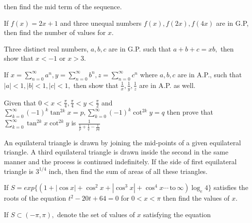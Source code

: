  then find the mid term of the sequence.
\item If $f(x) = 2x + 1$ and three unequal numbers $f(x), f(2x), f(4x)$ are in G.P, then find the number of values for
  $x$.
\item Three distinct real numbers, $a, b, c$ are in G.P. such that $a + b + c = xb,$ then show that $x < -1$ or $x > 3$.
\item If $\displaystyle x = \sum_{n=0}^\infty a^n, y = \sum_{n=0}^\infty b^n, z = \sum_{n=0}^\infty c^n$ where $a, b, c$ are in A.P.,
  such that $|a| < 1, |b|< 1, |c| < 1,$ then show that $\frac{1}{x}, \frac{1}{y}, \frac{1}{z}$ are in A.P. as well.
\item Given that $0 < x< \frac{\pi}{4}, \frac{\pi}{4} < y <\frac{\pi}{2}$ and $\displaystyle\sum_{k=0}^\infty(-1)^k\tan^{2k}x = p,
  \sum_{k=0}^\infty(-1)^k\cot^{2k}y = q$ then prove that $\displaystyle\sum_{k = 0}^\infty \tan^{2k}x\cot^{2k}y$ is $\frac{1}{\frac{1}{p} +
    \frac{1}{q} - \frac{1}{pq}}$
\item An equilateral triangle is drawn by joining the mid-points of a given equilateral triangle. A third equilateral
  triangle is drawn inside the second in the same manner and the process is continued indefinitely. If the side of first
  equilateral triangle is $3^{1/4}$ inch, then find the sum of areas of all these triangles.
\item If $S = exp\{(1 + |\cos x| + \cos^2x + |\cos^3x| + \cos^4x \cdots\,\text{to}\,\infty)\log_e 4\}$ satisfies the roots of
  the equation $t^2 - 20t + 64 = 0$ for $0 < x< \pi$ then find the values of $x$.
\item If $S\subset (-\pi, \pi),$ denote the set of values of $x$ satisfying the equation

